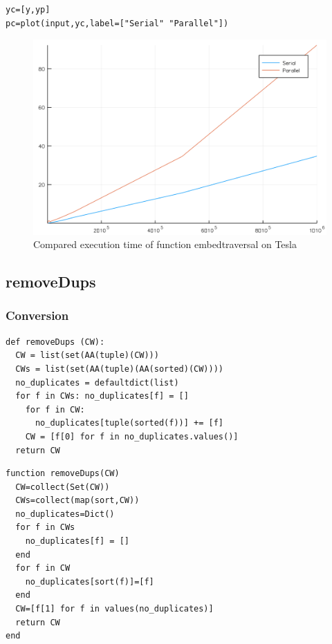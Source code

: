 \documentclass[a4paper,12pt]{article}
\begin{document}
\noindent {}
\begin{Verbatim}[fontsize=\footnotesize]
yc=[y,yp]
pc=plot(input,yc,label=["Serial" "Parallel"])
\end{Verbatim}
\begin{figure}[!h]
\centering
\includegraphics[scale=0.08]{compembedStruct.png}
\caption{Compared execution time of function embedtraversal on Tesla}
\end{figure}

\newpage
\subsection{removeDups}
\subsubsection{Conversion}
\begin{Verbatim}[fontsize=\footnotesize]
def removeDups (CW):
  CW = list(set(AA(tuple)(CW)))
  CWs = list(set(AA(tuple)(AA(sorted)(CW))))
  no_duplicates = defaultdict(list)
  for f in CWs: no_duplicates[f] = []
    for f in CW:
      no_duplicates[tuple(sorted(f))] += [f]
    CW = [f[0] for f in no_duplicates.values()]
  return CW  
\end{Verbatim}
\noindent{}
\begin{Verbatim}[fontsize=\footnotesize]
function removeDups(CW)
  CW=collect(Set(CW))
  CWs=collect(map(sort,CW))
  no_duplicates=Dict()
  for f in CWs
    no_duplicates[f] = []
  end
  for f in CW
    no_duplicates[sort(f)]=[f]
  end
  CW=[f[1] for f in values(no_duplicates)]
  return CW
end 
\end{Verbatim}
\end{document}
